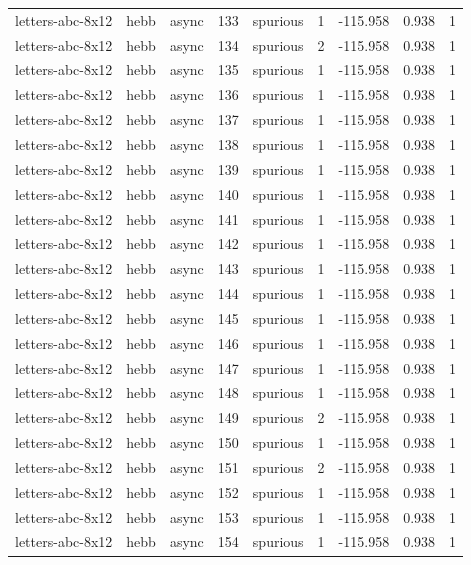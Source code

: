 \begin{tabular}{lllrlrrrr}
letters-abc-8x12 & hebb & async & 133 & spurious & 1 & -115.958 & 0.938 & 1 \\
letters-abc-8x12 & hebb & async & 134 & spurious & 2 & -115.958 & 0.938 & 1 \\
letters-abc-8x12 & hebb & async & 135 & spurious & 1 & -115.958 & 0.938 & 1 \\
letters-abc-8x12 & hebb & async & 136 & spurious & 1 & -115.958 & 0.938 & 1 \\
letters-abc-8x12 & hebb & async & 137 & spurious & 1 & -115.958 & 0.938 & 1 \\
letters-abc-8x12 & hebb & async & 138 & spurious & 1 & -115.958 & 0.938 & 1 \\
letters-abc-8x12 & hebb & async & 139 & spurious & 1 & -115.958 & 0.938 & 1 \\
letters-abc-8x12 & hebb & async & 140 & spurious & 1 & -115.958 & 0.938 & 1 \\
letters-abc-8x12 & hebb & async & 141 & spurious & 1 & -115.958 & 0.938 & 1 \\
letters-abc-8x12 & hebb & async & 142 & spurious & 1 & -115.958 & 0.938 & 1 \\
letters-abc-8x12 & hebb & async & 143 & spurious & 1 & -115.958 & 0.938 & 1 \\
letters-abc-8x12 & hebb & async & 144 & spurious & 1 & -115.958 & 0.938 & 1 \\
letters-abc-8x12 & hebb & async & 145 & spurious & 1 & -115.958 & 0.938 & 1 \\
letters-abc-8x12 & hebb & async & 146 & spurious & 1 & -115.958 & 0.938 & 1 \\
letters-abc-8x12 & hebb & async & 147 & spurious & 1 & -115.958 & 0.938 & 1 \\
letters-abc-8x12 & hebb & async & 148 & spurious & 1 & -115.958 & 0.938 & 1 \\
letters-abc-8x12 & hebb & async & 149 & spurious & 2 & -115.958 & 0.938 & 1 \\
letters-abc-8x12 & hebb & async & 150 & spurious & 1 & -115.958 & 0.938 & 1 \\
letters-abc-8x12 & hebb & async & 151 & spurious & 2 & -115.958 & 0.938 & 1 \\
letters-abc-8x12 & hebb & async & 152 & spurious & 1 & -115.958 & 0.938 & 1 \\
letters-abc-8x12 & hebb & async & 153 & spurious & 1 & -115.958 & 0.938 & 1 \\
letters-abc-8x12 & hebb & async & 154 & spurious & 1 & -115.958 & 0.938 & 1 \\

\end{tabular}
